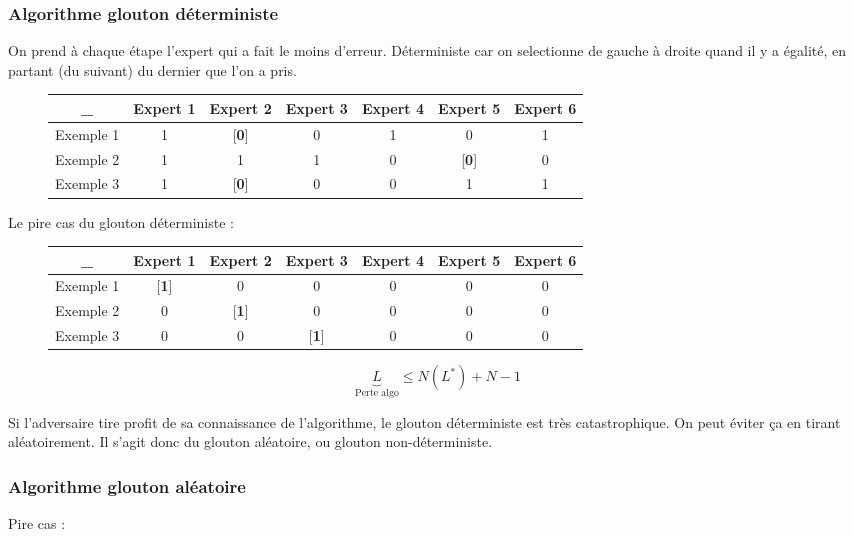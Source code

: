 \documentclass{article}
\begin{document}
\subsubsection*{Algorithme glouton déterministe}

On prend à chaque étape l'expert qui a fait le moins d'erreur. Déterministe car on selectionne de gauche à droite quand il y a égalité, en partant (du suivant) du dernier que l'on a pris.

\begin{figure}[H]
\begin{tabular}{|c|c|c|c|c|c|c|}
    \hline
    \_ & Expert 1 & Expert 2 & Expert 3 & Expert 4 & Expert 5 & Expert 6 \\
    \hline
    Exemple 1 & 1 & [\textbf{0}] & 0 & 1 & 0 & 1 \\
    Exemple 2 & 1 & 1 & 1 & 0 & [\textbf{0}] & 0 \\
    Exemple 3 & 1 & [\textbf{0}] & 0 & 0 & 1 & 1 \\
    \hline 
\end{tabular}
\end{figure}

Le pire cas du glouton déterministe :

\begin{figure}[H]
\begin{tabular}{|c|c|c|c|c|c|c|}
    \hline
    \_ & Expert 1 & Expert 2 & Expert 3 & Expert 4 & Expert 5 & Expert 6 \\
    \hline
    Exemple 1 & [\textbf{1}] & 0 & 0 & 0 & 0 & 0 \\
    Exemple 2 & 0 & [\textbf{1}] & 0 & 0 & 0 & 0 \\
    Exemple 3 & 0 & 0 & [\textbf{1}] & 0 & 0 & 0 \\
    \hline 
\end{tabular}
\end{figure}

\[ \underbrace{L}_{\text{Perte algo}} \leq N(L^{*}) + N - 1 \]

Si l'adversaire tire profit de sa connaissance de l'algorithme, le glouton déterministe est très catastrophique. On peut éviter ça en tirant aléatoirement. Il s'agit donc du glouton aléatoire, ou glouton non-déterministe.

\subsubsection*{Algorithme glouton aléatoire}

Pire cas : 
\end{document}
